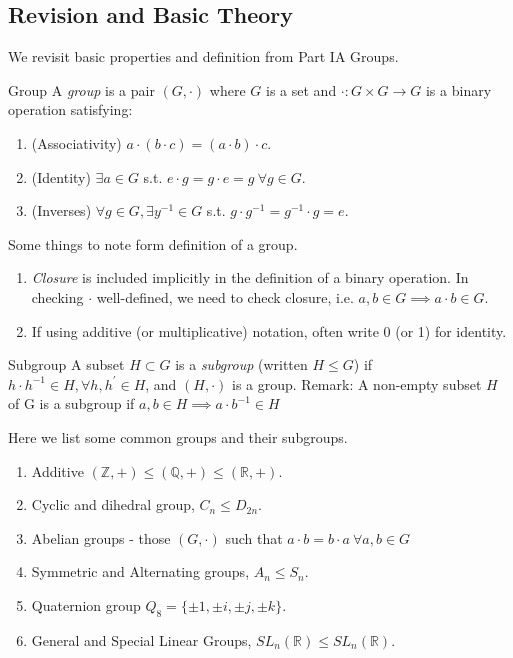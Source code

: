 \subsection{Revision and Basic Theory}
We revisit basic properties and definition from Part IA Groups.
\begin{definition}{Group}{}
    A \textit{group} is a pair \((G, \cdot)\) where \(G\) is a set and \(\cdot: G \times G \to G\) is a binary operation satisfying:
    \begin{enumerate}
        \item (Associativity) \(a \cdot (b \cdot c) = (a \cdot b) \cdot c \).
        \item (Identity) \(\exists a \in G\) s.t. \(e\cdot g = g \cdot e = g~\forall g \in G\).
        \item (Inverses) \(\forall g \in G, \exists y^{-1}\in G \) s.t. \( g\cdot g^{-1} = g^{-1}\cdot g = e\).
    \end{enumerate}
\end{definition}
\begin{remark}
    Some things to note form definition of a group.
    \begin{enumerate}
        \item \textit{Closure} is included implicitly in the definition of a binary operation. In checking \(\cdot\) well-defined, we need to check closure, i.e. \(a,b \in G \implies a\cdot b \in G\).
        \item If using additive (or multiplicative) notation, often write 0 (or 1) for identity.
    \end{enumerate}
\end{remark}

\begin{definition}{Subgroup}{}
A subset \(H \subset G\) is a \textit{subgroup} (written \(H \leq G\)) if \(h\cdot h^{-1}\in H, \forall h,h^\prime \in H\), and \((H, \cdot)\) is a group.
Remark: A non-empty subset \(H\) of G is a subgroup if \(a, b \in H \implies a\cdot b^{-1}\in H\) 
\end{definition}

\begin{example}
    Here we list some common groups and their subgroups.
    \begin{enumerate}
        \item Additive \((\mathbb{Z},+) \leq (\mathbb{Q},+) \leq (\mathbb{R},+)\).
        \item Cyclic and dihedral group, \(C_n \leq  D_{2n}\).
        \item Abelian groups - those \((G, \cdot)\) such that \(a \cdot b = b \cdot a~\forall a, b \in G\) 
        \item Symmetric and Alternating groups, \(A_n \leq  S_n\).
        \item Quaternion group \(Q_8 = \{\pm 1, \pm i, \pm j, \pm k\}\).
        \item General and Special Linear Groups, \(SL_n(\mathbb{R}) \leq  SL_n(\mathbb{R})\).
    \end{enumerate}
\end{example}

